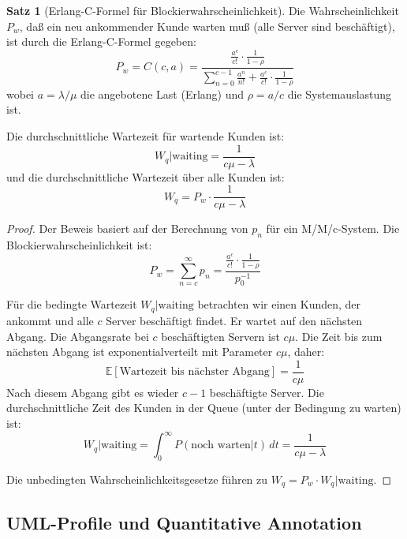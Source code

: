 \documentclass[a4paper,11pt]{article}
\theoremstyle{definition}
\newtheorem{satz}{Satz}
\newenvironment{beweis}{\begin{proof}}{\end{proof}}
\begin{document}
\begin{satz}[Erlang-C-Formel für Blockierwahrscheinlichkeit]
    \label{satz:erlangc_detailed}
    Die Wahrscheinlichkeit $P_w$, daß ein neu ankommender Kunde warten muß (alle Server sind 
    beschäftigt), ist durch die Erlang-C-Formel gegeben:
    \[
        P_w = C(c, a) = \frac{\frac{a^c}{c!} \cdot \frac{1}{1-\rho}}{\sum_{n=0}^{c-1} \frac{a^n}{n!} + 
               \frac{a^c}{c!} \cdot \frac{1}{1-\rho}}
    \]
    wobei $a = \lambda/\mu$ die angebotene Last (Erlang) und $\rho = a/c$ die Systemauslastung ist.

    Die durchschnittliche Wartezeit für wartende Kunden ist:
    \[
        W_q | \text{waiting} = \frac{1}{c\mu - \lambda}
    \]
    und die durchschnittliche Wartezeit über alle Kunden ist:
    \[
        W_q = P_w \cdot \frac{1}{c\mu - \lambda}
    \]

    \begin{beweis}
        Der Beweis basiert auf der Berechnung von $p_n$ für ein M/M/c-System. Die 
        Blockierwahrscheinlichkeit ist:
        \[
            P_w = \sum_{n=c}^{\infty} p_n = \frac{\frac{a^c}{c!} \cdot \frac{1}{1-\rho}}{p_0^{-1}}
        \]

        Für die bedingte Wartezeit $W_q | \text{waiting}$ betrachten wir einen Kunden, der 
        ankommt und alle $c$ Server beschäftigt findet. Er wartet auf den nächsten Abgang. 
        Die Abgangsrate bei $c$ beschäftigten Servern ist $c\mu$. Die Zeit bis zum nächsten 
        Abgang ist exponentialverteilt mit Parameter $c\mu$, daher:
        \[
            \mathbb{E}[\text{Wartezeit bis nächster Abgang}] = \frac{1}{c\mu}
        \]
        Nach diesem Abgang gibt es wieder $c-1$ beschäftigte Server. Die durchschnittliche 
        Zeit des Kunden in der Queue (unter der Bedingung zu warten) ist:
        \[
            W_q | \text{waiting} = \int_0^{\infty} P(\text{noch warten} | t) \, dt = \frac{1}{c\mu - \lambda}
        \]

        Die unbedingten Wahrscheinlichkeitsgesetze führen zu $W_q = P_w \cdot W_q | \text{waiting}$.
    \end{beweis}
\end{satz}

\subsection{UML-Profile und Quantitative Annotation}
\end{document}
